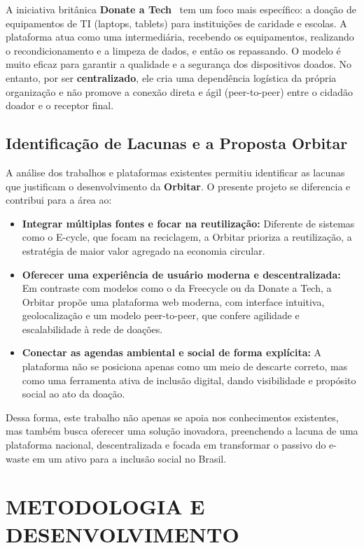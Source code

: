 \documentclass[
	12pt,				%
	openright,			%
	oneside,			%
	a4paper,			%
	english,			%
	brazil				%
	]{abntex2}
\theoremstyle{definition}
\begin{document}
A iniciativa britânica \textbf{Donate a Tech}~\cite{DonateTech} tem um foco mais específico: a doação de equipamentos de TI (laptops, tablets) para instituições de caridade e escolas. A plataforma atua como uma intermediária, recebendo os equipamentos, realizando o recondicionamento e a limpeza de dados, e então os repassando. O modelo é muito eficaz para garantir a qualidade e a segurança dos dispositivos doados. No entanto, por ser \textbf{centralizado}, ele cria uma dependência logística da própria organização e não promove a conexão direta e ágil (peer-to-peer) entre o cidadão doador e o receptor final.

\section{Identificação de Lacunas e a Proposta Orbitar}

A análise dos trabalhos e plataformas existentes permitiu identificar as lacunas que justificam o desenvolvimento da \textbf{Orbitar}. O presente projeto se diferencia e contribui para a área ao:

\begin{itemize}
    \item \textbf{Integrar múltiplas fontes e focar na reutilização:} Diferente de sistemas como o E-cycle, que focam na reciclagem, a Orbitar prioriza a reutilização, a estratégia de maior valor agregado na economia circular.
    \item \textbf{Oferecer uma experiência de usuário moderna e descentralizada:} Em contraste com modelos como o da Freecycle ou da Donate a Tech, a Orbitar propõe uma plataforma web moderna, com interface intuitiva, geolocalização e um modelo peer-to-peer, que confere agilidade e escalabilidade à rede de doações.
    \item \textbf{Conectar as agendas ambiental e social de forma explícita:} A plataforma não se posiciona apenas como um meio de descarte correto, mas como uma ferramenta ativa de inclusão digital, dando visibilidade e propósito social ao ato da doação.
\end{itemize}

Dessa forma, este trabalho não apenas se apoia nos conhecimentos existentes, mas também busca oferecer uma solução inovadora, preenchendo a lacuna de uma plataforma nacional, descentralizada e focada em transformar o passivo do e-waste em um ativo para a inclusão social no Brasil.

\chapter[METODOLOGIA E DESENVOLVIMENTO]{METODOLOGIA E DESENVOLVIMENTO}
\end{document}
